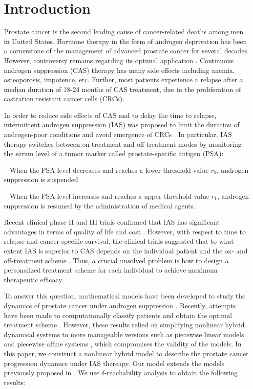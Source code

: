 \section{Introduction}
Prostate cancer is the second leading cause of cancer-related deaths among men in United States. %
Hormone therapy in the form of androgen deprivation has been a cornerstone of the management of advanced prostate cancer for several decades. However, controversy remains regarding its optimal application \citep{nru}. Continuous androgen suppression (CAS) therapy has many side effects including anemia, osteoporosis, impotence, etc. Further, most patients experience a relapse after a median duration of 18-24 months of CAS treatment, due to the proliferation of castration resistant cancer cells (CRCs).

In order to reduce side effects of CAS and to delay the time to relapse, intermittent androgen suppression (IAS) was proposed to limit the duration of androgen-poor conditions and avoid emergence of CRCs \citep{bruchovsky95}. In particular, IAS therapy switches between on-treatment and off-treatment modes by monitoring the serum level of a tumor marker called prostate-specific antigen (PSA):

-- When the PSA level decreases and reaches a lower threshold value $r_0$, androgen suppression is suspended.

-- When the PSA level increases and reaches a upper threshold value $r_1$, androgen suppression is resumed by the administration of medical agents.

Recent clinical phase II and III trials confirmed that IAS has significant advantages in terms of quality of life and cost \cite{bruchovsky06,bruchovsky07}. However, with respect to time to relapse and cancer-specific survival, the clinical trials suggested that to what extent IAS is superior to CAS depends on the individual patient and the on- and off-treatment scheme \citep{bruchovsky06,bruchovsky07}. Thus, a crucial unsolved problem is how to design a personalized treatment scheme for each individual to achieve maximum therapeutic efficacy.

To answer this question, mathematical models have been developed to study the dynamics of prostate cancer under androgen suppression \citep{jackson04a,jackson04b,ideta08,hirata10,pnas11,portz12}. Recently, attempts have been made to computationally classify patients and obtain the optimal treatment scheme \citep{chaos10,suzuki10}. However, these results relied on simplifying nonlinear hybrid dynamical systems to more manageable versions such as piecewise linear models \citep{chaos10} and piecewise affine systems \citep{suzuki10}, which compromises the validity of the models. In this paper, we construct a nonlinear hybrid model to describe the prostate cancer progression dynamics under IAS thereapy. Our model extends the models previously proposed in \citep{jackson04a,jackson04b,ideta08}. We use $\delta$-reachability analysis to obtain the following results:

